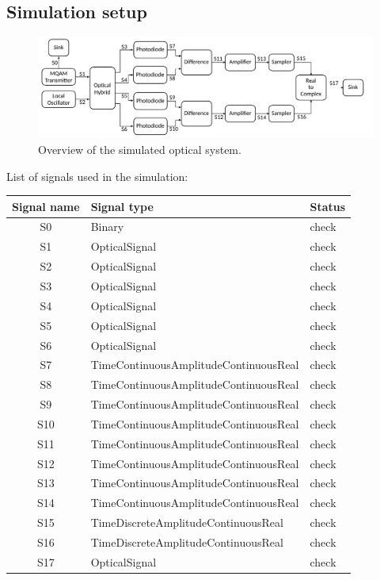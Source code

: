 \subsection{Simulation setup}

\begin{figure}[H]
\centering
\includegraphics[width=\linewidth]{./sdf/quantum_noise/figures/scheme_setup.pdf}
\caption{Overview of the simulated optical system.}
\label{fig:setup}
\end{figure}
%
\vspace{1em}
%
List of signals used in the simulation:
\begin{table}[H]
\centering
\begin{tabular}{|c|l|l|}
\hline
\bf{Signal name}	& \bf{Signal type}						& \bf{Status}\\
\hline
S0					& Binary								& check\\
S1					& OpticalSignal							& check\\
S2					& OpticalSignal							& check\\
S3					& OpticalSignal							& check\\
S4					& OpticalSignal							& check\\
S5					& OpticalSignal							& check\\
S6					& OpticalSignal							& check\\
S7					& TimeContinuousAmplitudeContinuousReal	& check\\
S8					& TimeContinuousAmplitudeContinuousReal	& check\\
S9					& TimeContinuousAmplitudeContinuousReal	& check\\
S10					& TimeContinuousAmplitudeContinuousReal	& check\\
S11					& TimeContinuousAmplitudeContinuousReal	& check\\
S12					& TimeContinuousAmplitudeContinuousReal	& check\\
S13					& TimeContinuousAmplitudeContinuousReal	& check\\
S14					& TimeContinuousAmplitudeContinuousReal	& check\\
S15					& TimeDiscreteAmplitudeContinuousReal	& check\\
S16					& TimeDiscreteAmplitudeContinuousReal	& check\\
S17					& OpticalSignal							& check\\
\hline
\end{tabular}
\end{table}
